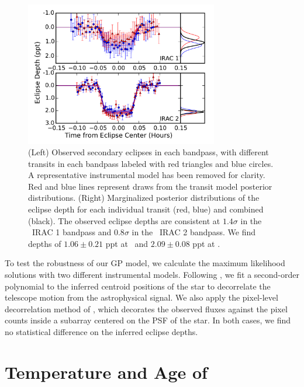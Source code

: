 \begin{figure}[htbp!]
\centerline{\includegraphics[width=0.75\textwidth]{chapter5/f2.pdf}}
\caption[Observed secondary eclipses and marginalized posterior distributions of the measured eclipse depths]{(Left) Observed secondary eclipses in each bandpass, with different transits in
each bandpass labeled with red triangles and blue circles. A representative instrumental
model has been removed for clarity. Red and blue lines represent 
draws from the transit model posterior distributions.
(Right) Marginalized posterior distributions of the eclipse depth for each individual
transit (red, blue) and combined (black). The observed eclipse depths are
consistent at $1.4 \sigma$ in the \ira\ IRAC 1 bandpass and 
$0.8\sigma$ in the \irb\ IRAC 2 bandpass. We find depths of
$1.06 \pm 0.21$ ppt at \ira\ and $2.09 \pm 0.08$ ppt at \irb. }
\label{fig:depths}
\end{figure}



To test the robustness of our GP model, we calculate the maximum
likelihood solutions with two different instrumental models.
Following \citet{Knutson08}, we fit a second-order polynomial
to the inferred centroid positions of the star to decorrelate the telescope motion
from the astrophysical signal. 
We also apply the pixel-level decorrelation method of \citet{Deming15}, which
decorates the observed fluxes against the pixel counts inside a subarray centered on the
PSF of the star.
In both cases, we find no statistical difference on the inferred eclipse depths.




\section{Temperature and Age of \LC}

